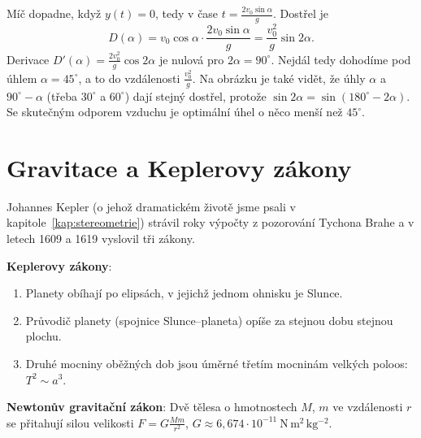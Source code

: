 \begin{center}
\end{center}

\begin{example}
  Míč dopadne, když $y(t) = 0$, tedy v čase $t = \frac{2v_0\sin\alpha}{g}$. Dostřel je
  \begin{equation*}
    D(\alpha) = v_0\cos\alpha\cdot\frac{2v_0\sin\alpha}{g} = \frac{v_0^2}{g}\sin 2\alpha.
  \end{equation*}
  Derivace $D'(\alpha) = \frac{2v_0^2}{g}\cos 2\alpha$ je nulová pro $2\alpha = 90^\circ$. Nejdál tedy dohodíme pod úhlem $\alpha = 45^\circ$, a to do vzdálenosti $\frac{v_0^2}{g}$. Na obrázku je také vidět, že úhly $\alpha$ a $90^\circ - \alpha$ (třeba $30^\circ$ a $60^\circ$) dají stejný dostřel, protože $\sin 2\alpha = \sin(180^\circ - 2\alpha)$. Se skutečným odporem vzduchu je optimální úhel o něco menší než $45^\circ$.
\end{example}

\section{Gravitace a Keplerovy zákony}

Johannes Kepler (o jehož dramatickém životě jsme psali v kapitole~\ref{kap:stereometrie}) strávil roky výpočty z pozorování Tychona Brahe a v letech 1609 a 1619 vyslovil tři zákony.

\begin{definitionbox}
  \textbf{Keplerovy zákony}:
  \begin{enumerate}
    \item Planety obíhají po elipsách, v jejichž jednom ohnisku je Slunce.
    \item Průvodič planety (spojnice Slunce--planeta) opíše za stejnou dobu stejnou plochu.
    \item Druhé mocniny oběžných dob jsou úměrné třetím mocninám velkých poloos: $T^2\sim a^3$.
  \end{enumerate}
  \textbf{Newtonův gravitační zákon}: Dvě tělesa o hmotnostech $M$, $m$ ve vzdálenosti $r$ se přitahují silou velikosti $F = G\frac{Mm}{r^2}$, $G\approx 6{,}674\cdot 10^{-11}\ \mathrm{N\,m^2\,kg^{-2}}$.
\end{definitionbox}

